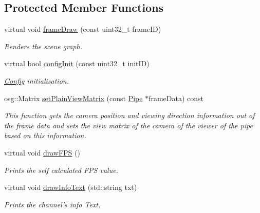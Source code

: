 \subsection*{Protected Member Functions}
\begin{CompactItemize}
\item 
virtual void \hyperlink{a00002_70cfd22742da9b9aa3e3478f356ba220}{frameDraw} (const uint32\_\-t frameID)
\begin{CompactList}\small\item\em Renders the scene graph. \item\end{CompactList}\item 
virtual bool \hyperlink{a00002_15ff8d6c9962d86d886dba9485082dde}{configInit} (const uint32\_\-t initID)
\begin{CompactList}\small\item\em \hyperlink{a00003}{Config} initialisation. \item\end{CompactList}\item 
osg::Matrix \hyperlink{a00002_d3a369c393e8065327ef37cef65e25c7}{setPlainViewMatrix} (const \hyperlink{a00014}{Pipe} $\ast$frameData) const 
\begin{CompactList}\small\item\em This function gets the camera position and viewing direction information out of the frame data and sets the view matrix of the camera of the viewer of the pipe based on this information. \item\end{CompactList}\item 
\hypertarget{a00002_2950f8b33948b9f8fea20910b95fc695}{
virtual void \hyperlink{a00002_2950f8b33948b9f8fea20910b95fc695}{drawFPS} ()}
\label{a00002_2950f8b33948b9f8fea20910b95fc695}

\begin{CompactList}\small\item\em Prints the self calculated FPS value. \item\end{CompactList}\item 
\hypertarget{a00002_e0efffd06ae7a755b7f0c80641d5e6d7}{
virtual void \hyperlink{a00002_e0efffd06ae7a755b7f0c80641d5e6d7}{drawInfoText} (std::string txt)}
\label{a00002_e0efffd06ae7a755b7f0c80641d5e6d7}

\begin{CompactList}\small\item\em Prints the channel's info Text. \item\end{CompactList}\end{CompactItemize}


